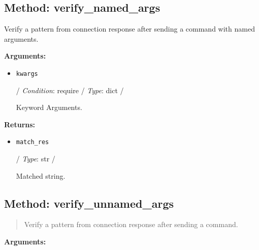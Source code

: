 \hypertarget{qconnectbase-connection-manager-method-verify_named_args-38}{%
\subsection{Method:
verify\_named\_args}\label{qconnectbase-connection-manager-method-verify_named_args-38}}

Verify a pattern from connection response after sending a command with
named arguments.

\textbf{Arguments:}

\begin{itemize}
\item
  \texttt{kwargs}

  / \emph{Condition}: require / \emph{Type}: dict /

  Keyword Arguments.
\end{itemize}

\textbf{Returns:}

\begin{itemize}
\item
  \texttt{match\_res}

  / \emph{Type}: str /

  Matched string.
\end{itemize}

\hypertarget{qconnectbase-connection-manager-method-verify_unnamed_args-39}{%
\subsection{Method:
verify\_unnamed\_args}\label{qconnectbase-connection-manager-method-verify_unnamed_args-39}}

\begin{quote}
Verify a pattern from connection response after sending a command.
\end{quote}

\textbf{Arguments:}

